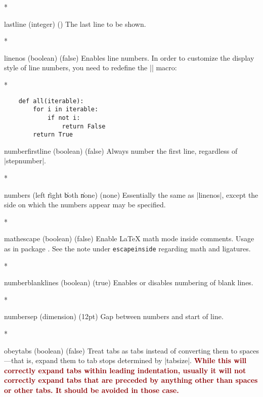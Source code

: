 \begin{paracol}{2}
\begin{optionlist}
\switchcolumn[0]*%
  \item[lastline (integer) (\meta{last line of input})]
    The last line to be shown.
    \switchcolumn

\switchcolumn[0]*%
  \item[linenos (boolean) (false)]
    Enables line numbers.
    In order to customize the display style of line numbers, you need to redefine the |\theFancyVerbLine| macro:
    \switchcolumn

    \switchcolumn[0]*%
\begin{example}
    \renewcommand{\theFancyVerbLine}{\sffamily
        \textcolor[rgb]{0.5,0.5,1.0}{\scriptsize
        \oldstylenums{\arabic{FancyVerbLine}}}}

    \begin{verbatim}
    def all(iterable):
        for i in iterable:
            if not i: 
                return False
        return True
    \end{verbatim}
\end{example}

\item[numberfirstline (boolean) (false)]
Always number the first line, regardless of |stepnumber|.
\switchcolumn

\switchcolumn[0]*%

  \item[numbers (left \| right \| both \| none) (none)]
    Essentially the same as |linenos|, except the side on which the numbers appear may be specified.
    \switchcolumn

\switchcolumn[0]*%
  \item[mathescape (boolean) (false)]
    Enable \LaTeX{} math mode inside comments.
    Usage as in package .
    See the note under \texttt{escapeinside} regarding math and ligatures.
    \switchcolumn

\switchcolumn[0]*%
  \item[numberblanklines (boolean) (true)]
    Enables or disables numbering of blank lines.
    \switchcolumn

\switchcolumn[0]*%
  \item[numbersep (dimension) (12pt)]
    Gap between numbers and start of line.
    \switchcolumn

\switchcolumn[0]*%
  \item[obeytabs (boolean) (false)]
    Treat tabs as tabs instead of converting them to spaces---that is, expand them to tab stops determined by |tabsize|.  \textcolor{DarkRed}{\textbf{While this will correctly expand tabs within leading indentation, usually it will not correctly expand tabs that are preceded by anything other than spaces or other tabs.  It should be avoided in those case.}}
    \switchcolumn


\end{optionlist}
\end{paracol}
